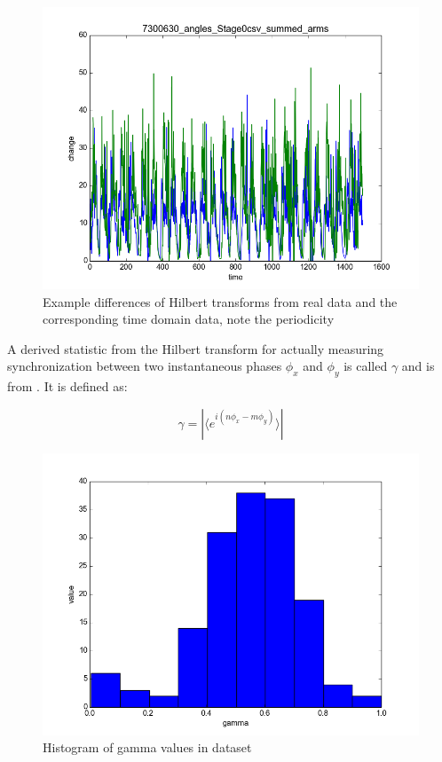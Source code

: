 \documentclass[12pt]{article}
\begin{document}
\begin{figure}
\begin{center}
    \includegraphics[scale=0.4]{time_2}
  \end{center}
  \caption{Example differences of Hilbert transforms from real data and the corresponding time domain data, note the periodicity}
\end{figure}

A derived statistic from the Hilbert transform for actually measuring synchronization between two instantaneous phases $\phi_x$ and $\phi_y$ is called $\gamma$ and is from \cite{gamma}. It is defined as:

$$ \gamma = |\langle e^{i(n\phi_x - m\phi_y)} \rangle| $$

\begin{figure}\label{fig:total_gammas}
  \begin{center}
    \includegraphics[scale=0.6]{total_gammas}
  \end{center}
  \caption{Histogram of gamma values in dataset}
\end{figure}
\end{document}
